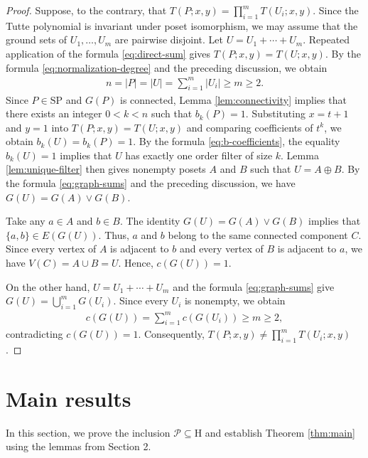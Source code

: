 \documentclass[10pt,a4paper]{amsart}
\begin{document}
\begin{proof}
Suppose, to the contrary, that $T(P;x,y)=\prod_{i=1}^{m}T(U_i;x,y)$.
Since the Tutte polynomial is invariant under poset isomorphism,
we may assume that the ground sets of $U_1,\ldots,U_m$ are pairwise disjoint.
Let $U=U_1+\cdots+U_m$.
Repeated application of the formula \eqref{eq:direct-sum} gives $T(P;x,y)=T(U;x,y)$.
By the formula \eqref{eq:normalization-degree} and the preceding discussion, we obtain
\begin{eqnarray*}
n=|P|=|U|=\sum_{i=1}^{m}|U_i|\geq m\geq 2.
\end{eqnarray*}
Since $P\in\mathrm{SP}$ and $G(P)$ is connected,
Lemma \ref{lem:connectivity} implies that there exists an integer $0<k<n$ such that $b_k(P)=1$.
Substituting $x=t+1$ and $y=1$ into $T(P;x,y)=T(U;x,y)$ and comparing coefficients of $t^k$,
we obtain $b_k(U)=b_k(P)=1$.
By the formula \eqref{eq:b-coefficients}, the equality $b_k(U)=1$ implies that $U$ has exactly one order filter of size $k$.
Lemma \ref{lem:unique-filter} then gives nonempty posets $A$ and $B$ such that $U=A\oplus B$.
By the formula \eqref{eq:graph-sums} and the preceding discussion, we have $G(U)=G(A)\vee G(B)$.

Take any $a\in A$ and $b\in B$.
The identity $G(U)=G(A)\vee G(B)$ implies that $\{a,b\}\in E(G(U))$.
Thus, $a$ and $b$ belong to the same connected component $C$.
Since every vertex of $A$ is adjacent to $b$ and every vertex of $B$ is adjacent to $a$,
we have $V(C)=A\cup B=U$. Hence, $c(G(U))=1$.

On the other hand, $U=U_1+\cdots+U_m$ and the formula \eqref{eq:graph-sums} give $G(U)=\bigcup_{i=1}^{m}G(U_i)$.
Since every $U_i$ is nonempty, we obtain
\begin{eqnarray*}
c(G(U))=\sum_{i=1}^{m}c(G(U_i))\geq m\geq 2,
\end{eqnarray*}
contradicting $c(G(U))=1$. Consequently, $T(P;x,y)\neq\prod_{i=1}^{m}T(U_i;x,y)$.
\end{proof}

\section{Main results}

In this section, we prove the inclusion $\mathcal P\subseteq\mathrm H$ and establish
Theorem \ref{thm:main} using the lemmas from Section 2.
\end{document}
